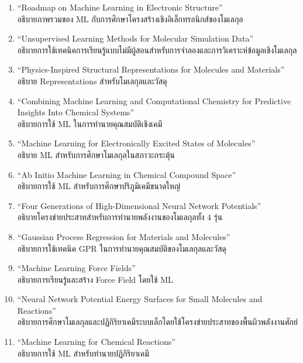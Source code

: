 \begin{enumerate}
    \item \enquote{Roadmap on Machine Learning in Electronic Structure}\autocite{kulik2022}\\
    อธิบายภาพรวมของ ML กับการศึกษาโครงสร้างเชิงอิเล็กทรอนิกส์ของโมเลกุล
    
    \item \enquote{Unsupervised Learning Methods for Molecular Simulation Data}\autocite{glielmo2021}\\
    อธิบายการใช้เทคนิคการเรียนรู้แบบไม่มีผู้สอนสำหรับการจำลองและการวิเคราะห์ข้อมูลเชิงโมเลกุล

    \item \enquote{Physics-Inspired Structural Representations for Molecules and Materials}\autocite{musil2021}\\
    อธิบาย Representations สำหรับโมเลกุลและวัสดุ

    \item \enquote{Combining Machine Learning and Computational Chemistry for Predictive Insights Into Chemical 
    Systems}\autocite{keith2021}\\
    อธิบายการใช้ ML ในการทำนายคุณสมบัติเชิงเคมี

    \item \enquote{Machine Learning for Electronically Excited States of Molecules}\autocite{westermayr2021a}\\
    อธิบาย ML สำหรับการศึกษาโมเลกุลในสภาวะกระตุ้น

    \item \enquote{Ab Initio Machine Learning in Chemical Compound Space}\autocite{huang2021}\\
    อธิบายการใช้ ML สำหรับการศึกษาปริภูมิเคมีขนาดใหญ่

    \item \enquote{Four Generations of High-Dimensional Neural Network Potentials}\autocite{behler2021}\\
    อธิบายโครงข่ายประสาทสำหรับการทำนายพลังงานของโมเลกุลทั้ง 4 รุ่น

    \item \enquote{Gaussian Process Regression for Materials and Molecules}\autocite{deringer2021}\\
    อธิบายการใช้เทคนิค GPR ในการทำนายคุณสมบัติของโมเลกุลและวัสดุ

    \item \enquote{Machine Learning Force Fields}\autocite{unke2021}\\
    อธิบายการเรียนรู้และสร้าง Force Field โดยใช้ ML

    \item \enquote{Neural Network Potential Energy Surfaces for Small Molecules and Reactions}\autocite{manzhos2021}\\
    อธิบายการศึกษาโมเลกุลและปฏิกิริยาเคมีระบบเล็กโดยใช้โครงข่ายประสาทของพื้นผิวพลังงานศักย์

    \item \enquote{Machine Learning for Chemical Reactions}\autocite{meuwly2021}\\
    อธิบายการใช้ ML สำหรับทำนายปฏิกิริยาเคมี
\end{enumerate}
